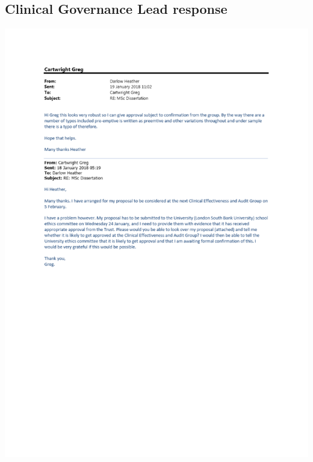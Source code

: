 \documentclass
[
	12pt,
	a4paper,
	oneside,
]{article}
\begin{document}
\begin{appendix}
\section{Clinical Governance Lead response}
\label{appendix:clingov}
\includegraphics[width=\textwidth]{heather.pdf}

\end{appendix}
\end{document}
